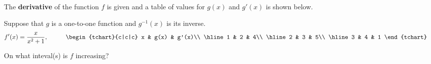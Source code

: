 \documentclass{ximera}
\author{Gregory Hartman \and Matthew Carr}
\begin{document}
\begin{exercise}



The \textbf{derivative} of the function $f$ is given and a table of values for $g(x)$ and $g'(x)$ is shown below.

Suppose that $g$ is a one-to-one function and $g^{-1}(x)$ is its inverse.
\[
f'(x)=\frac{x}{x^2+1},\hskip 1cm
\begin{tchart}{c|c|c}
x & g(x) & g'(x)\\ \hline
1 & 2 & 4\\ \hline
2 & 3 & 5\\ \hline
3 & 4 & 1
\end{tchart}
\]

On what inteval(s) is $f$ increasing?
\begin{prompt}
\begin{multipleChoice}
\end{multipleChoice}
\end{prompt}

\end{exercise}
\end{document}
